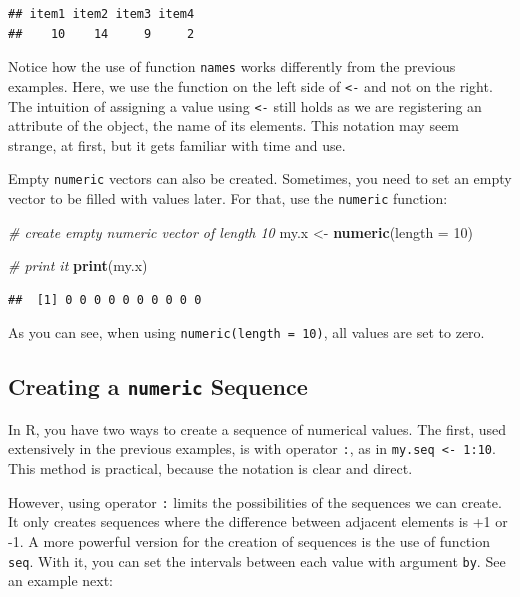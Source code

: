 \documentclass[11pt,]{book}
\newenvironment{Shaded}{\begin{snugshade}}{\end{snugshade}}
\newcommand{\KeywordTok}[1]{\textcolor[rgb]{0.27,0.27,0.27}{\textbf{#1}}}
\newcommand{\DataTypeTok}[1]{\textcolor[rgb]{0.27,0.27,0.27}{#1}}
\newcommand{\DecValTok}[1]{\textcolor[rgb]{0.06,0.06,0.06}{#1}}
\newcommand{\StringTok}[1]{\textcolor[rgb]{0.5,0.5,0.5}{#1}}
\newcommand{\CommentTok}[1]{\textcolor[rgb]{0.56,0.35,0.01}{\textit{#1}}}
\newcommand{\NormalTok}[1]{#1}
\begin{document}
\begin{verbatim}
## item1 item2 item3 item4 
##    10    14     9     2
\end{verbatim}

Notice how the use of function \texttt{names} works differently from the
previous examples. Here, we use the function on the left side of
\texttt{\textless{}-} and not on the right. The intuition of assigning a
value using \texttt{\textless{}-} still holds as we are registering an
attribute of the object, the name of its elements. This notation may
seem strange, at first, but it gets familiar with time and use.

Empty \texttt{numeric} vectors can also be created. Sometimes, you need
to set an empty vector to be filled with values later. For that, use the
\texttt{numeric} function: 

\begin{Shaded}
\begin{Highlighting}[]
\CommentTok{# create empty numeric vector of length 10}
\NormalTok{my.x <-}\StringTok{ }\KeywordTok{numeric}\NormalTok{(}\DataTypeTok{length =} \DecValTok{10}\NormalTok{)}

\CommentTok{# print it}
\KeywordTok{print}\NormalTok{(my.x)}
\end{Highlighting}
\end{Shaded}

\begin{verbatim}
##  [1] 0 0 0 0 0 0 0 0 0 0
\end{verbatim}

As you can see, when using \texttt{numeric(length\ =\ 10)}, all values
are set to zero.

\subsection{\texorpdfstring{Creating a \texttt{numeric}
Sequence}{Creating a numeric Sequence}}\label{creating-a-numeric-sequence}

In R, you have two ways to create a sequence of numerical values. The
first, used extensively in the previous examples, is with operator
\texttt{:}, as in \texttt{my.seq\ \textless{}-\ 1:10}. This method is
practical, because the notation is clear and direct. \index{:}

However, using operator \texttt{:} limits the possibilities of the
sequences we can create. It only creates sequences where the difference
between adjacent elements is +1 or -1. A more powerful version for the
creation of sequences is the use of function \texttt{seq}. With it, you
can set the intervals between each value with argument \texttt{by}. See
an example next: 
\end{document}

